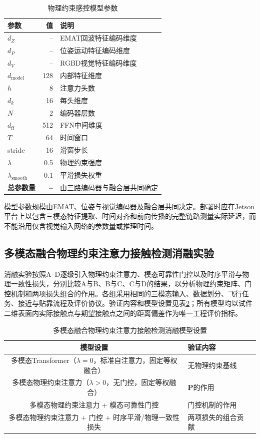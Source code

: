 \begin{table}[htbp]
\centering
\caption{物理约束感控模型参数}
\label{tab:model_params}
\begin{tabular}{lrl}
\toprule
\textbf{参数} & \textbf{值} & \textbf{说明} \\
\midrule
$d_Z$ & -- & EMAT回波特征编码维度 \\
$d_P$ & -- & 位姿运动特征编码维度 \\
$d_V$ & -- & RGBD视觉特征编码维度 \\
$d_{\text{model}}$ & 128 & 内部特征维度 \\
$h$ & 8 & 注意力头数 \\
$d_k$ & 16 & 每头维度 \\
$N$ & 2 & 编码器层数 \\
$d_{\text{ff}}$ & 512 & FFN中间维度 \\
$T$ & 64 & 时间窗口 \\
stride & 16 & 滑窗步长 \\
$\lambda$ & 0.5 & 物理约束强度 \\
$\lambda_{\text{smooth}}$ & 0.1 & 平滑损失权重 \\
\midrule
\textbf{总参数量} & \textbf{--} & 由三路编码器与融合层共同确定 \\
\bottomrule
\end{tabular}
\end{table}

模型参数规模由EMAT、位姿与视觉编码器及融合层共同决定。部署时应在Jetson平台上以包含三模态特征提取、时间对齐和前向传播的完整链路测量实际延迟，而不能沿用仅含视觉输入网络的参数量或推理时间。

\subsection{多模态融合物理约束注意力接触检测消融实验}

消融实验按照A--D逐级引入物理约束注意力、模态可靠性门控以及时序平滑与物理一致性损失，分别比较A与B、B与C、C与D的结果，以分析物理约束矩阵、门控机制和两项损失组合的作用。各组采用相同的三模态输入、数据划分、飞行任务、接近与贴靠流程及评价协议。验证内容和模型设置见表\ref{tab:mm_ablation_design}；所有模型均以试件二维表面内实际接触点与期望接触点之间的距离偏差作为唯一工程评价指标。

\begin{table}[htbp]
\centering
\caption{多模态融合物理约束注意力接触检测消融模型设置}
\label{tab:mm_ablation_design}
\begin{tabular}{cll}
\toprule
\textbf{模型设置} & \textbf{验证内容} \\
\midrule
多模态Transformer（$\lambda=0$，标准自注意力，固定等权融合） & 无物理约束基线 \\
多模态物理约束注意力（$\lambda>0$，无门控，固定等权融合） & $\mathbf{P}$的作用 \\
多模态物理约束注意力 + 模态可靠性门控 & 门控机制的作用 \\
多模态物理约束注意力 + 门控 + 时序平滑/物理一致性损失 & 两项损失的组合贡献 \\
\bottomrule
\end{tabular}
\end{table}

